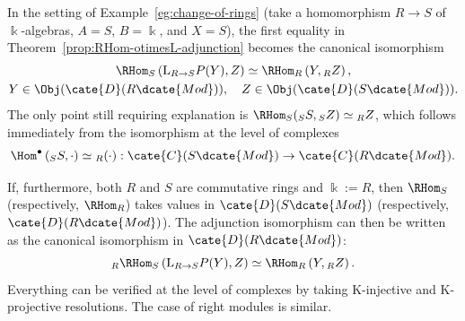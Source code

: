 \begin{example}\label{eg:change-of-ring-adjunction}
	In the setting of Example~\ref{eg:change-of-rings} (take a homomorphism
	$R\to S$ of $\Bbbk$-algebras, $A=S$, $B=\Bbbk$, and $X=S$), the first
	equality in Theorem~\ref{prop:RHom-otimesL-adjunction} becomes the canonical
	isomorphism
	\begin{gather*}
		\RHom_S\left( \mathrm{L} {}_{R \to S} P(Y), Z \right) \simeq \RHom_R\left( Y, {}_R Z \right), \\
		Y \in \Obj(\cate{D}(R\dcate{Mod})), \quad Z \in \Obj(\cate{D}(S\dcate{Mod})).
	\end{gather*}
	The only point still requiring explanation is
	$\RHom_S({}_S S,{}_S Z)\simeq{}_R Z$, which follows immediately from the
	isomorphism at the level of complexes
	\[ \Hom^\bullet\left({}_S S, \cdot\right) \simeq {}_R (\cdot) : \cate{C}(S\dcate{Mod}) \to \cate{C}(R\dcate{Mod}). \]

	If, furthermore, both $R$ and $S$ are commutative rings and $\Bbbk:=R$,
	then $\RHom_S$ (respectively, $\RHom_R$) takes values in
	$\cate{D}(S\dcate{Mod})$ (respectively, $\cate{D}(R\dcate{Mod})$). The
	adjunction isomorphism can then be written as the canonical isomorphism in
	$\cate{D}(R\dcate{Mod})$:
	\[ {}_R \RHom_S\left( \mathrm{L} {}_{R \to S} P(Y), Z \right) \simeq \RHom_R\left( Y, {}_R Z \right) . \]
	Everything can be verified at the level of complexes by taking K-injective
	and K-projective resolutions. The case of right modules is similar.
\end{example}


